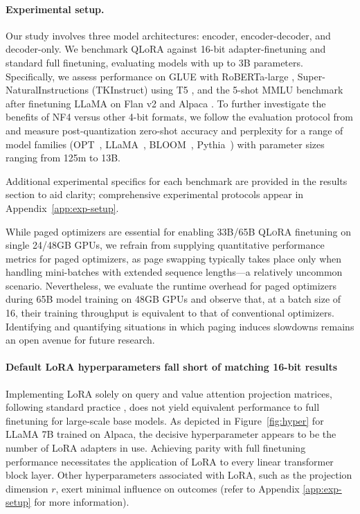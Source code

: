 \paragraph{Experimental setup.} Our study involves three model architectures: encoder, encoder-decoder, and decoder-only. We benchmark QLoRA against 16-bit adapter-finetuning and standard full finetuning, evaluating models with up to 3B parameters. Specifically, we assess performance on GLUE \citep{wang2018glue} with RoBERTa-large \citep{liu2019roberta}, Super-NaturalInstructions (TKInstruct) \citep{wang2022super} using T5 \citep{t5}, and the 5-shot MMLU benchmark \citep{hendrycksmeasuring} after finetuning LLaMA on Flan v2 \citep{longpre2023flan} and Alpaca \citep{alpaca}. To further investigate the benefits of NF4 versus other 4-bit formats, we follow the evaluation protocol from \citet{dettmers2022case} and measure post-quantization zero-shot accuracy and perplexity for a range of model families (OPT~\citep{zhang2022opt}, LLaMA~\citep{touvron2023llama}, BLOOM~\citep{scao2022bloom}, Pythia~\citep{biderman2023pythia}) with parameter sizes ranging from 125m to 13B.

Additional experimental specifics for each benchmark are provided in the results section to aid clarity; comprehensive experimental protocols appear in Appendix~\ref{app:exp-setup}.

While paged optimizers are essential for enabling 33B/65B \textsc{QLoRA} finetuning on single 24/48GB GPUs, we refrain from supplying quantitative performance metrics for paged optimizers, as page swapping typically takes place only when handling mini-batches with extended sequence lengths—a relatively uncommon scenario. Nevertheless, we evaluate the runtime overhead for paged optimizers during 65B model training on 48GB GPUs and observe that, at a batch size of 16, their training throughput is equivalent to that of conventional optimizers. Identifying and quantifying situations in which paging induces slowdowns remains an open avenue for future research.

\paragraph{Default LoRA hyperparameters fall short of matching 16-bit results} 

Implementing LoRA solely on query and value attention projection matrices, following standard practice \citep{hu2021lora}, does not yield equivalent performance to full finetuning for large-scale base models. As depicted in Figure~\ref{fig:hyper} for LLaMA 7B trained on Alpaca, the decisive hyperparameter appears to be the number of LoRA adapters in use. Achieving parity with full finetuning performance necessitates the application of LoRA to every linear transformer block layer. Other hyperparameters associated with LoRA, such as the projection dimension $r$, exert minimal influence on outcomes (refer to Appendix \ref{app:exp-setup} for more information).

